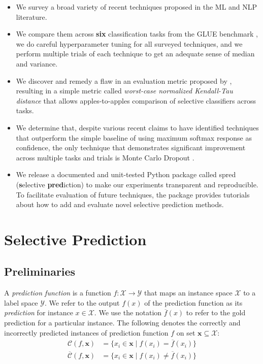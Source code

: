 \documentclass[11pt]{article}
\begin{document}
\begin{itemize}
	\item We survey a broad variety of recent techniques proposed in the ML and NLP literature.
	\item We compare them across \textbf{six} classification tasks from the \textsc{GLUE} benchmark \cite{wang-etal-2018-glue}, we do careful hyperparameter tuning for all surveyed techniques, and we perform multiple trials of each technique to get an adequate sense of median and variance.
	\item We discover and remedy a flaw in an evaluation metric proposed by \cite{xin-etal-2021-art}, resulting in a simple metric called \emph{worst-case normalized Kendall-Tau distance} that allows apples-to-apples comparison of selective classifiers across tasks.
	\item We determine that, despite various recent claims to have identified techniques that outperform the simple baseline \cite{HendrycksG17} of using maximum softmax response as confidence, the only technique that demonstrates significant improvement across multiple tasks and trials is Monte Carlo Dropout \cite{gal2016dropout}.
	\item We release a documented and unit-tested Python package called \textsf{spred} (\textbf{s}elective \textbf{pred}iction) to make our experiments transparent and reproducible. To facilitate evaluation of future techniques, the package provides tutorials about how to add and evaluate novel selective prediction methods.
\end{itemize}

\section{Selective Prediction}

\subsection{Preliminaries}

A \emph{prediction function} is a function $f: \mathcal{X} \rightarrow \mathcal{Y}$ that maps an instance space $\mathcal{X}$ to a label space $\mathcal{Y}$. We refer to the output $f(x)$ of the prediction function as its \emph{prediction} for instance $x \in \mathcal{X}$. We use the notation $\overline{f}(x)$ to refer to the gold prediction for a particular instance. The following denotes the correctly and incorrectly predicted instances of prediction function $f$ on set $\mathbf{x} \subseteq \mathcal{X}$:
\begin{eqnarray*}
\mathcal{C}(f,\mathbf{x})
&= \{ x_i \in \mathbf{x} \mid f(x_i) = \overline{f}(x_i) \} \\
\overline{\mathcal{C}}(f,\mathbf{x})
&= \{ x_i \in \mathbf{x} \mid f(x_i) \neq \overline{f}(x_i) \}
\end{eqnarray*}
\end{document}
